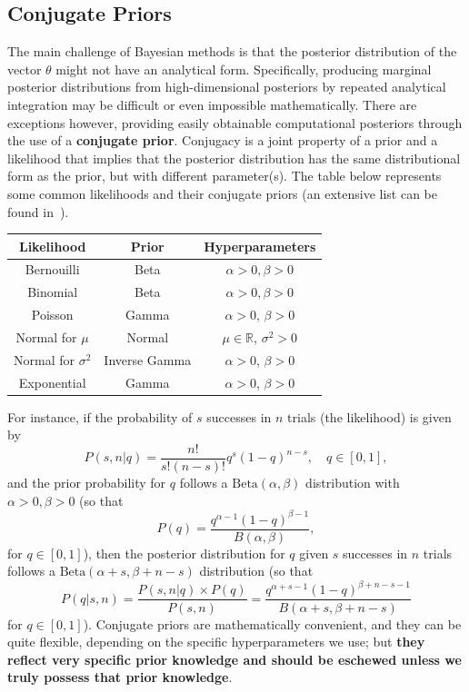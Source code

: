 \subsection{Conjugate Priors}
The main challenge of Bayesian methods is that the posterior distribution of the vector $\theta$ might not have an analytical form.  Specifically, producing marginal posterior distributions from high-dimensional posteriors by repeated analytical integration may be difficult or even impossible mathematically.  There are exceptions however, providing easily obtainable computational posteriors through the use of a \textbf{conjugate prior}.  Conjugacy is a joint property of a prior and a likelihood that implies that the posterior distribution has the same distributional form as the prior, but with different parameter(s).  \newl The table below represents some common likelihoods and their conjugate priors (an extensive list can be found in~\cite{BDA_N122}). 
\begin{center} 
\begin{tabular}{ccc} 
 \hline
  \textbf{Likelihood} & \textbf{Prior} & \textbf{Hyperparameters} \\ \hline
 Bernouilli&Beta&$\alpha>0,\beta>0$
	\\  
 Binomial&Beta&$\alpha>0,\beta>0$
	\\  
 Poisson&Gamma&$\alpha >0$, $\beta>0$
  \\  
 Normal for $\mu$&Normal&$\mu\in\mathbb{R}$, $\sigma^{2}>0$
  \\  
 Normal for $\sigma^{2}$&Inverse Gamma&$\alpha >0$, $\beta>0$
  \\  
 Exponential&Gamma&$\alpha >0$, $\beta>0$									
\\ \hline
\end{tabular}
\end{center}
For instance, if the probability of $s$ successes in $n$ trials (the likelihood) is given by $$P(s,n|q)=\frac{n!}{s!(n-s)!}q^s(1-q)^{n-s}, \quad q\in [0,1], $$ and the prior probability for $q$ follows a $\text{Beta}(\alpha,\beta)$ distribution with $\alpha>0, \beta>0$ (so that $$P(q)=\frac{q^{\alpha-1}(1-q)^{\beta-1}}{B(\alpha,\beta)}, $$ for $q\in [0,1]$), then the posterior distribution for $q$ given $s$ successes in $n$ trials follows a $\text{Beta}(\alpha+s,\beta+n-s)$ distribution (so that  $$P(q|s,n)=\frac{P(s,n|q)\times P(q)}{P(s,n)}=\frac{q^{\alpha+s-1}(1-q)^{\beta+n-s-1}}{B(\alpha+s,\beta+n-s)}$$ for $q\in [0,1]$). \newl 
Conjugate priors are mathematically convenient, and they can be quite flexible, depending on the specific hyperparameters we use; but \textbf{they reflect very specific prior knowledge and should be eschewed unless we truly possess that prior knowledge}.  


